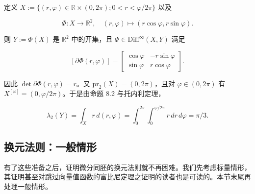 \begin{example}

定义 $ X := \{ (r, \varphi) \in \mathbb{R} \times (0, 2\pi) ; 0 < r < \varphi/2\pi \} $ 以及

\[
\Phi : X \to \mathbb{R}^{2} , \quad (r, \varphi) \mapsto (r \cos\varphi, r \sin\varphi) .
\]

则 $ Y := \Phi(X) $ 是 $ \mathbb{R}^{2} $ 中的开集，且 $ \Phi \in \mathrm{Diff}^{\infty}(X, Y) $ 满足

\begin{equation*}
\left[\partial\Phi(r, \varphi)\right] = \begin{bmatrix} \cos\varphi & -r\sin\varphi \\ \sin\varphi & r\cos\varphi \end{bmatrix} .
\end{equation*}

因此 $ \det \partial\Phi(r, \varphi) = r $。又 $ \mathrm{pr}_{2}(X) = (0, 2\pi) $，且对 $ \varphi \in (0, 2\pi) $ 有 $ X^{[\varphi]} = (0, \varphi/2\pi) $。于是由命题 8.2 与托内利定理，

\[
\lambda_{2}(Y) = \int_{X} r \, d(r, \varphi) = \int_{0}^{2\pi} \int_{0}^{\varphi/2\pi} r \, dr \, d\varphi = \pi/3 .
\]
\end{example}

\subsection*{换元法则：一般情形}

有了这些准备之后，证明微分同胚的换元法则就不再困难。我们先考虑标量情形，其证明甚至对跳过向量值函数的富比尼定理之证明的读者也是可读的。本节末尾再处理一般情形。

